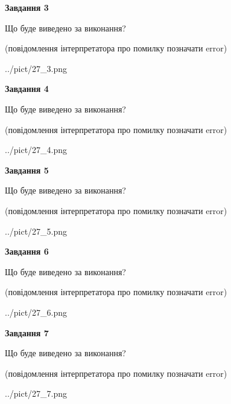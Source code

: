 \documentclass[12pt, ukrainian]{article}
\begin{document}
{\begin {large}
{\begin {center}\textbf{Завдання 3}\end {center}}\par
Що буде виведено за виконання?\par
 (повідомлення інтерпретатора про помилку позначати error)\par
\begin{center}
	{../pict/27_3.png}
\end{center}
\newpage

{\begin {center}\textbf{Завдання 4}\end {center}}\par
Що буде виведено за виконання?\par
 (повідомлення інтерпретатора про помилку позначати error)\par
\begin{center}
	{../pict/27_4.png}
\end{center}
\newpage

{\begin {center}\textbf{Завдання 5}\end {center}}\par
Що буде виведено за виконання?\par
 (повідомлення інтерпретатора про помилку позначати error)\par
\begin{center}
	{../pict/27_5.png}
\end{center}
\newpage

{\begin {center}\textbf{Завдання 6}\end {center}}\par
Що буде виведено за виконання?\par
 (повідомлення інтерпретатора про помилку позначати error)\par
\begin{center}
	{../pict/27_6.png}
\end{center}
\newpage

{\begin {center}\textbf{Завдання 7}\end {center}}\par
Що буде виведено за виконання?\par
 (повідомлення інтерпретатора про помилку позначати error)\par
\begin{center}
	{../pict/27_7.png}
\end{center}
\newpage


\end{large}}
\end{document}
